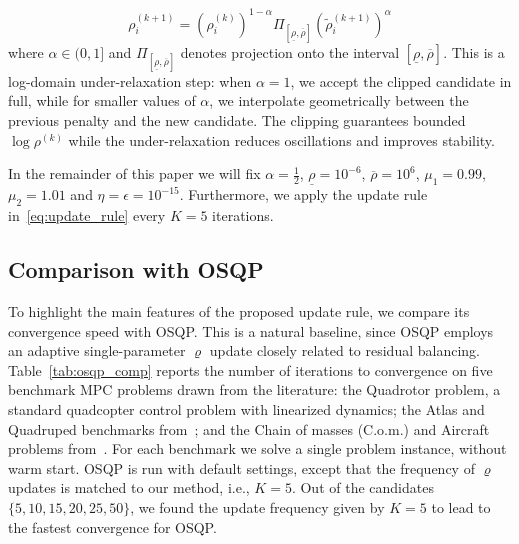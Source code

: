 \documentclass[letterpaper, 10 pt, conference]{ieeeconf}  %
\begin{document}
\begin{equation}
\label{eq:update_rule}
    \rho_i^{(k+1)} =\left( \rho^{(k)}_i \right)^{1-\alpha} \Pi_{[\underline{\rho}, \overline{\rho}]} \left(\tilde{\rho}_i^{(k+1)}\right)^{\alpha} 
\end{equation}
where $\alpha\in (0,1]$ and $\Pi_{[\underline{\rho}, \overline{\rho}]}$ denotes projection onto the interval 
$[\underline{\rho}, \overline{\rho}]$. This is a log-domain under-relaxation step: when $\alpha=1$, we accept the clipped candidate in full, while for smaller values of $\alpha$, we interpolate geometrically between the previous penalty and the new candidate. The clipping guarantees bounded $\log\rho^{(k)}$ while the under-relaxation reduces oscillations and improves stability.

In the remainder of this paper we will fix $\alpha = \frac{1}{2}$, $\underline{\rho} = 10^{-6}$, $\overline{\rho} = 10^6$, $\mu_1 = 0.99$, $\mu_2 = 1.01$ and $\eta = \epsilon = 10^{-15}$. Furthermore, we apply the update rule in~\eqref{eq:update_rule} every $K = 5$ iterations.

\subsection{Comparison with OSQP}

To highlight the main features of the proposed update rule, we compare its convergence speed with OSQP. This is a natural baseline, since OSQP employs an adaptive single-parameter $
\varrho$ update closely related to residual balancing. Table~\ref{tab:osqp_comp} reports the number of iterations to convergence on five benchmark MPC problems drawn from the literature: the Quadrotor problem, a standard quadcopter control problem with linearized dynamics; the Atlas and Quadruped benchmarks from~\cite{reluqp}; and the Chain of masses (C.o.m.) and Aircraft problems from~\cite{mpc_benchmarks}. For each benchmark we solve a single problem instance, without warm start. OSQP is run with default settings, except that the frequency of $\varrho$ updates is matched to our method, i.e., $K=5$. Out of the candidates $\{5, 10, 15, 20, 25, 50\}$, we found the update frequency given by $K=5$ to lead to the fastest convergence for OSQP.
\end{document}
